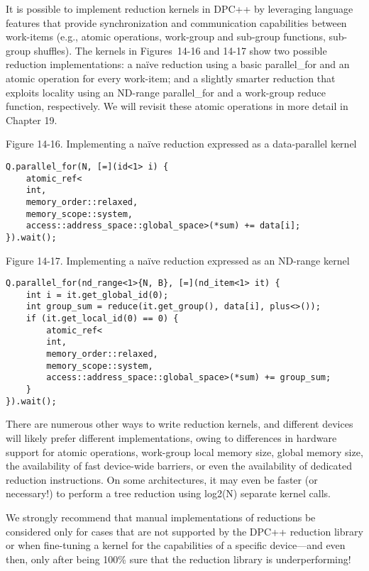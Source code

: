 It is possible to implement reduction kernels in DPC++ by leveraging language features that provide synchronization and communication capabilities between work-items (e.g., atomic operations, work-group and sub-group functions, sub-group shuffles). The kernels in Figures 14-16 and 14-17 show two possible reduction implementations: a naïve reduction using a basic parallel\_for and an atomic operation for every work-item; and a slightly smarter reduction that exploits locality using an ND-range parallel\_for and a work-group reduce function, respectively. We will revisit these atomic operations in more detail in Chapter 19.\par

\hspace*{\fill} \par %
Figure 14-16. Implementing a naïve reduction expressed as a data-parallel kernel
\begin{lstlisting}[caption={}]
Q.parallel_for(N, [=](id<1> i) {
	atomic_ref<
	int,
	memory_order::relaxed,
	memory_scope::system,
	access::address_space::global_space>(*sum) += data[i];
}).wait();
\end{lstlisting}

\hspace*{\fill} \par %
Figure 14-17. Implementing a naïve reduction expressed as an ND-range kernel
\begin{lstlisting}[caption={}]
Q.parallel_for(nd_range<1>{N, B}, [=](nd_item<1> it) {
	int i = it.get_global_id(0);
	int group_sum = reduce(it.get_group(), data[i], plus<>());
	if (it.get_local_id(0) == 0) {
		atomic_ref<
		int,
		memory_order::relaxed,
		memory_scope::system,
		access::address_space::global_space>(*sum) += group_sum;
	}
}).wait();
\end{lstlisting}

There are numerous other ways to write reduction kernels, and different devices will likely prefer different implementations, owing to differences in hardware support for atomic operations, work-group local memory size, global memory size, the availability of fast device-wide barriers, or even the availability of dedicated reduction instructions. On some architectures, it may even be faster (or necessary!) to perform a tree reduction using log2(N) separate kernel calls.\par

We strongly recommend that manual implementations of reductions be considered only for cases that are not supported by the DPC++ reduction library or when fine-tuning a kernel for the capabilities of a specific device—and even then, only after being 100\% sure that the reduction library is underperforming!\par

